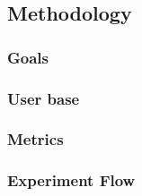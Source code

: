 \subsection{Methodology}

\subsubsection{Goals}


\subsubsection{User base}




\subsubsection{Metrics}



\subsubsection{Experiment Flow}


